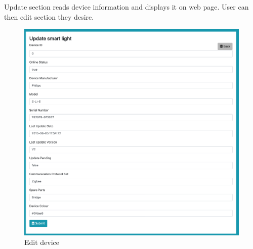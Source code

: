 Update section reads device information and displays it on web page. User can then edit section they desire.
\begin{figure}[H]
\includegraphics[scale=0.4]{img/editDevice.jpeg}
\centering
\caption{Edit device}
\end{figure}